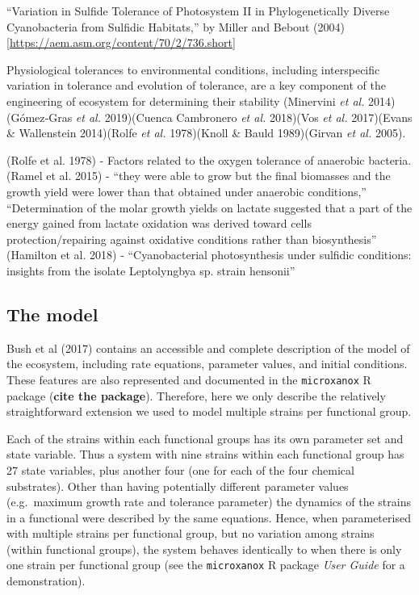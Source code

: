 \documentclass{article}
\begin{document}
``Variation in Sulfide Tolerance of Photosystem II in Phylogenetically
Diverse Cyanobacteria from Sulfidic Habitats,'' by Miller and Bebout
(2004) {[}\url{https://aem.asm.org/content/70/2/736.short}{]}

Physiological tolerances to environmental conditions, including
interspecific variation in tolerance and evolution of tolerance, are a
key component of the engineering of ecosystem for determining their
stability (Minervini \emph{et al.} 2014)(Gómez‐Gras \emph{et al.}
2019)(Cuenca Cambronero \emph{et al.} 2018)(Vos \emph{et al.}
2017)(Evans \& Wallenstein 2014)(Rolfe \emph{et al.} 1978)(Knoll \&
Bauld 1989)(Girvan \emph{et al.} 2005).

(Rolfe et al. 1978) - Factors related to the oxygen tolerance of
anaerobic bacteria. (Ramel et al. 2015) - ``they were able to grow but
the final biomasses and the growth yield were lower than that obtained
under anaerobic conditions,'' ``Determination of the molar growth yields
on lactate suggested that a part of the energy gained from lactate
oxidation was derived toward cells protection/repairing against
oxidative conditions rather than biosynthesis'' (Hamilton et al. 2018) -
``Cyanobacterial photosynthesis under sulfidic conditions: insights from
the isolate Leptolyngbya sp. strain hensonii''

\hypertarget{the-model}{%
\subsection{The model}\label{the-model}}

Bush et al (2017) contains an accessible and complete description of the
model of the ecosystem, including rate equations, parameter values, and
initial conditions. These features are also represented and documented
in the \texttt{microxanox} R package (\textbf{cite the package}).
Therefore, here we only describe the relatively straightforward
extension we used to model multiple strains per functional group.

Each of the strains within each functional groups has its own parameter
set and state variable. Thus a system with nine strains within each
functional group has 27 state variables, plus another four (one for each
of the four chemical substrates). Other than having potentially
different parameter values (e.g.~maximum growth rate and tolerance
parameter) the dynamics of the strains in a functional were described by
the same equations. Hence, when parameterised with multiple strains per
functional group, but no variation among strains (within functional
groups), the system behaves identically to when there is only one strain
per functional group (see the \texttt{microxanox} R package \emph{User
Guide} for a demonstration).
\end{document}
